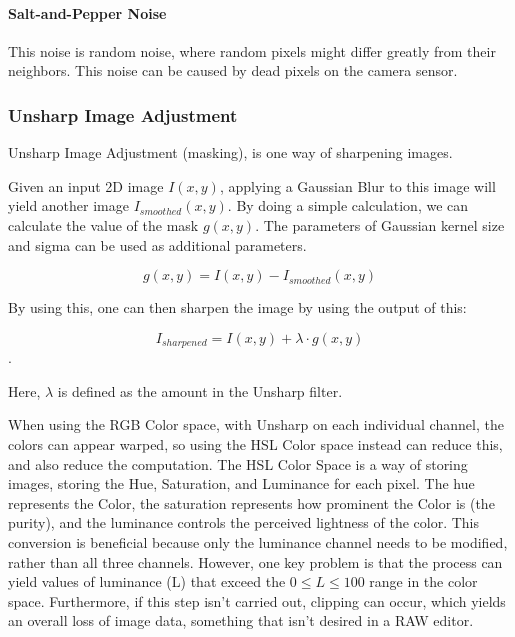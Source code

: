\documentclass[10pt,a4paper]{article}
\begin{document}
\paragraph{Salt-and-Pepper Noise}
    This noise is random noise, where random pixels might differ greatly from their neighbors. This noise can be caused
    by dead pixels on the camera sensor. \cite{NRandFiltering}
    



\subsubsection{Unsharp Image Adjustment}
    Unsharp Image Adjustment (masking), is one way of sharpening images.

    Given an input 2D image $I(x, y)$, applying a Gaussian Blur to this image will yield another image $I_{smoothed}(x, y)$.
    By doing a simple calculation, we can calculate the value of the mask $g(x, y)$. The parameters of Gaussian kernel size and 
    sigma can be used as additional parameters.

    $$g(x, y) = I(x, y) -  I_{smoothed}(x, y)$$

    By using this, one can then sharpen the image by using the output of this:

    $$I_{sharpened} = I(x, y) + \lambda \cdot g(x, y)$$.

    Here, $\lambda$ is defined as the amount in the Unsharp filter.
    
    \cite{Unsharp}

    When using the RGB Color space, with Unsharp on each individual channel, the colors can appear warped, so using the HSL Color space instead
    can reduce this, and also reduce the computation. The HSL Color Space is a way of storing images, storing the Hue, Saturation, and Luminance
    for each pixel. The hue represents the Color, the saturation represents how prominent the Color is (the purity), and the luminance controls 
    the perceived lightness of the color. This conversion is beneficial because only the luminance channel needs to be modified, rather than all three channels.
    However, one key problem is that the process can yield values of luminance (L) that exceed the $0 \le L \le 100$ range in the color space.
    Furthermore, if this step isn't carried out, clipping can occur, which yields an overall loss of image data, something that isn't desired in a RAW editor.
\end{document}
